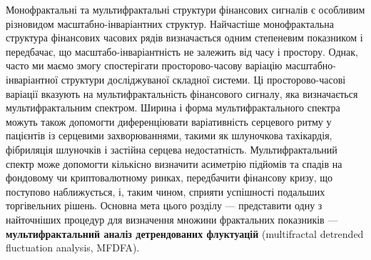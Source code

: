 \documentclass[
  letterpaper,
]{report}
\begin{document}
Монофрактальні та мультифрактальні структури фінансових сигналів є
особливим різновидом масштабно-інваріантних структур. Найчастіше
монофрактальна структура фінансових часових рядів визначається одним
степеневим показником і передбачає, що масштабо-інваріантність не
залежить від часу і простору. Однак, часто ми маємо змогу спостерігати
просторово-часову варіацію масштабно-інваріантної структури
досліджуваної складної системи. Ці просторово-часові варіації вказують
на мультифрактальність фінансового сигналу, яка визначається
мультифрактальним спектром. Ширина і форма мультифрактального спектра
можуть також допомогти диференціювати варіативність серцевого ритму у
пацієнтів із серцевими захворюваннями, такими як шлуночкова тахікардія,
фібриляція шлуночків і застійна серцева недостатність. Мультифрактальний
спектр може допомогти кількісно визначити асиметрію підйомів та спадів
на фондовому чи криптовалютному ринках, передбачити фінансову кризу, що
поступово наближується, і, таким чином, сприяти успішності подальших
торгівельних рішень. Основна мета цього розділу --- представити одну з
найточніших процедур для визначення множини фрактальних показників ---
\textbf{мультифрактальний аналіз детрендованих флуктуацій} (multifractal
detrended fluctuation analysis, MFDFA).
\end{document}
